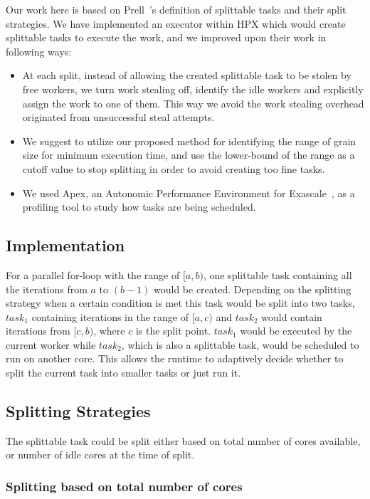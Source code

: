 Our work here is based on Prell~\cite{prell2016embracing}'s definition of splittable tasks and their split strategies. We have implemented an executor within HPX which would create splittable tasks to execute the work, and we improved upon their work in following ways:

\begin{itemize}
\item At each split, instead of allowing the created splittable task to be stolen by free workers, we turn work stealing off, identify the idle workers and explicitly assign the work to one of them. This way we avoid the work stealing overhead originated from unsuccessful steal attempts. 
\item We suggest to utilize our proposed method for identifying the range of grain size for minimum execution time, and use the lower-bound of the range as a cutoff value to stop splitting in order to avoid creating too fine tasks.   
\item We used Apex, an Autonomic Performance Environment for Exascale~\cite{huck2015autonomic}, as a profiling tool to study how tasks are being scheduled.
\end{itemize}




\subsection{Implementation}
For a parallel for-loop with the range of $[a,b)$, one splittable task containing all the iterations from $a$ to $(b-1)$ would be created. Depending on the splitting strategy when a certain condition is met this task would be split into two tasks, $task_1$ containing iterations in the range of $[a,c)$ and $task_2$ would contain iterations from $[c,b)$, where $c$ is the split point. $task_1$ would be executed by the current worker while $task_2$, which is also a splittable task, would be scheduled to run on another core. This allows the runtime to adaptively decide whether to split the current task into smaller tasks or just run it.     

 
\subsection{Splitting Strategies}
The splittable task could be split either based on total number of cores available, or number of idle cores at the time of split. 

\subsubsection{Splitting based on total number of cores}

